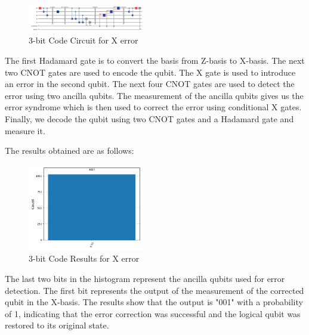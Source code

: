 \documentclass[conference]{IEEEtran}
\begin{document}
\begin{figure}[h]
    \centering
    \includegraphics[width=0.45\textwidth]{../Codes/results/3bitCode/3bitCodeCircuit.png}
    \caption{3-bit Code Circuit for X error}
    \label{fig:3bitCodeCircuit}
\end{figure}

The first Hadamard gate is to convert the basis from Z-basis to X-basis. The next two CNOT gates are used to encode the qubit. The X gate is used to introduce an error in the second qubit. The next four CNOT gates are used to detect the error using two ancilla qubits. The measurement of the ancilla qubits gives us the error syndrome which is then used to correct the error using conditional X gates. Finally, we decode the qubit using two CNOT gates and a Hadamard gate and measure it. 

The results obtained are as follows:
\begin{figure}[h]
    \centering
    \includegraphics[width=0.45\textwidth]{../Codes/results/3bitCode/3bitCodeHistogram.png}
    \caption{3-bit Code Results for X error}
    \label{fig:3bitCodeResults} 
\end{figure}

The last two bits in the histogram represent the ancilla qubits used for error detection. The first bit represents the output of the measurement of the corrected qubit in the X-basis. The results show that the output is "001" with a probability of 1, indicating that the error correction was successful and the logical qubit was restored to its original state. 
\end{document}
